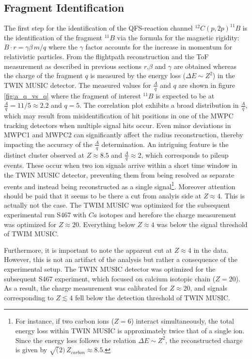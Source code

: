 \subsection{Fragment Identification}\label{sec:frag_ident}
The first step for the identification of the QFS-reaction channel $^{12}C(p,2p)^{11}B$ is the identification of the fragment $^{11}B$ via the formula for the magnetic rigidity: $ B\cdot r = \gamma\beta \, m /q$ where the $\gamma$ factor accounts for the increase in momentum for relativistic particles. From the flightpath reconstruction and the ToF measurement as described in previous sections $r$,$\beta$ and $\gamma$ are obtained whereas the charge of the fragment $q$ is measured by the energy loss ($\Delta E \sim Z^2$) in the TWIN MUSIC detector.\newline
The measured values for $\frac{A}{q}$ and $q$ are shown in figure \ref{fig:a_q_vs_q} where the fragment of interest $^{11}B$ is expected to be at $\frac{A}{q} = 11/5 \approx 2.2$ and $q = 5$. The correlation plot exhibits a broad distribution in $\frac{A}{q}$, which may result from misidentification of hit positions in one of the MWPC tracking detectors when multiple signal hits occur. Even minor deviations in MWPC1 and MWPC2 can significantly affect the radius reconstruction, thereby impacting the accuracy of the $\frac{A}{q}$ determination.\newline
An intriguing feature is the distinct cluster observed at $Z \approx 8.5$ and $\frac{A}{q} \approx 2$, which corresponds to pileup events. These occur when two ion signals arrive within a short time window in the TWIN MUSIC detector, preventing them from being resolved as separate events and instead being reconstructed as a single signal\footnote{For instance, if two carbon ions ($Z=6$) interact simultaneously, the total energy loss within TWIN MUSIC is approximately twice that of a single ion. Since the energy loss follows the relation $\Delta E \sim Z^2$, the reconstructed charge is given by $\sqrt(2)\,Z_{carbon} \approx 8.5 $.}.
Moreover attention should be paid that it seems to be there a cut from analyis side at $Z \approx 4$. This is actually not the case. The TWIM MUSIC was optimized for the subsequent experimental run S467 with $Ca$ isotopes and herefore the charge measurement was optimized for $Z\approx 20$. Everything below $Z \approx 4$ was below the signal threshold of TWIM MUSIC.

Furthermore, it is important to note the apparent cut at $Z \approx 4$ in the data. However, this is not an artifact of the analysis but rather a consequence of the experimental setup. The TWIN MUSIC detector was optimized for the subsequent S467 experiment, which focused on calcium isotopic chain ($Z = 20$). As a result, the charge measurement was calibrated for $Z \approx 20$, and signals corresponding to $Z \lesssim 4$ fell below the detection threshold of TWIN MUSIC.

